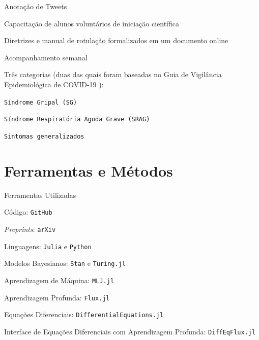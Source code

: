 \documentclass[aspectratio=169]{beamer}                    %
\begin{document}
\begin{frame}{Anotação de Tweets}
    \begin{vfilleditems}
        \item Capacitação de alunos voluntários de iniciação científica
        \item Diretrizes e manual de rotulação formalizados em um documento online
        \item Acompanhamento semanal
        \item Três categorias (duas das quais foram baseadas no Guia de Vigilância Epidemiológica de COVID-19 \parencite{GuiaCoronavirus}):
        \begin{vfilleditems}
            \item \texttt{Síndrome Gripal (SG)}
            \item \texttt{Síndrome Respiratória Aguda Grave (SRAG)}
            \item \texttt{Sintomas generalizados}
        \end{vfilleditems}
    \end{vfilleditems}
\end{frame}


\section{Ferramentas e Métodos}

\begin{frame}{Ferramentas Utilizadas}
    \begin{vfilleditems}
        \item Código: \texttt{GitHub}
        \item \textit{Preprints}: \texttt{arXiv}
        \item Linguagens: \texttt{Julia} \parencite{bezanson2017julia} e \texttt{Python}
        \item Modelos Bayesianos: \texttt{Stan} \parencite{carpenterStanProbabilisticProgramming2017} e \texttt{Turing.jl} \parencite{geTuringLanguageFlexible2018}
        \item Aprendizagem de Máquina: \texttt{MLJ.jl} \parencite{blaomMLJJuliaPackage2020}
        \item Aprendizagem Profunda: \texttt{Flux.jl} \parencite{innes:2018}
        \item Equações Diferenciais: \texttt{DifferentialEquations.jl} \parencite{rackauckasComposingModelingSimulation2021}
        \item Interface de Equações Diferenciais com Aprendizagem Profunda: \texttt{DiffEqFlux.jl} \parencite{rackauckasUniversalDifferentialEquations2020}
    \end{vfilleditems}
\end{frame}
\end{document}
